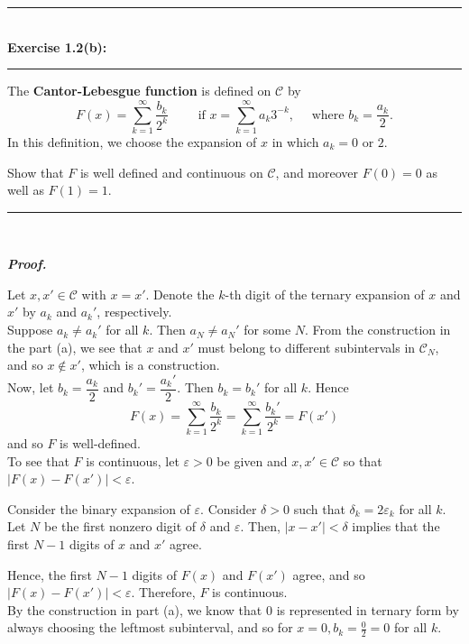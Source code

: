 \documentclass[a4paper,11pt]{article}
\begin{document}
\begin{flushleft}
	\rule[-0.5ex]{17cm}{2pt}\\
		\textbf{Exercise 1.2(b):}\\
	\rule[1.5ex]{17cm}{0.5pt}
		The \textbf{Cantor-Lebesgue function} is defined on $\mathcal{C}$ by
			$$F(x) = \overset{\infty}{\underset{k = 1}{\sum}} \frac{b_k}{2^k}
			\quad \quad \text{ if }
			x = \overset{\infty}{\underset{k = 1}{\sum}} a_k 3^{-k},
			\quad \text{ where } b_k = \frac{a_k}{2}.$$
		In this definition, we choose the expansion of $x$ in which $a_k = 0$ or $2$.

		Show that $F$ is well defined and continuous on $\mathcal{C}$, and moreover $F(0) = 0$ as well as $F(1) = 1$.
	\rule[1.0ex]{17cm}{0.5pt}\
\end{flushleft}

\textbf{\textit{Proof.}}

Let $x, x' \in \mathcal{C}$ with $x = x'$. Denote the $k$-th digit of the ternary expansion of $x$ and $x'$ by $a_k$ and $a_k'$, respectively.\\

Suppose $a_k \neq a_k'$ for all $k$. Then $a_N \neq a_N'$ for some $N$. From the construction in the part (a), we see that $x$ and $x'$ must belong to different subintervals in $\mathcal{C}_N$, and so $x \notin x'$, which is a construction.\\

Now, let $b_k = \dfrac{a_k}{2}$ and $b_k' = \dfrac{a_k'}{2}$. Then $b_k = b_k'$ for all $k$. Hence
	$$F(x)
	= \overset{\infty}{\underset{k = 1}{\sum}} \frac{b_k}{2^k}
	= \overset{\infty}{\underset{k = 1}{\sum}} \frac{b_k'}{2^k}
	= F(x')$$
and so $F$ is well-defined.\\

To see that $F$ is continuous, let $\varepsilon > 0$ be given and $x, x' \in \mathcal{C}$ so that $|F(x) - F(x')| < \varepsilon$.

Consider the binary expansion of $\varepsilon$. Consider $\delta > 0$ such that $\delta_k = 2 \varepsilon_k$ for all $k$. Let $N$ be the first nonzero digit of $\delta$ and $\varepsilon$. Then, $|x - x'| < \delta$ implies that the first $N - 1$ digits of $x$ and $x'$ agree.

Hence, the first $N - 1$ digits of $F(x)$ and $F(x')$ agree, and so $|F(x) - F(x')| < \varepsilon$. Therefore, $F$ is continuous.\\

By the construction in part (a), we know that $0$ is represented in ternary form by always choosing the leftmost subinterval, and so for $x = 0, b_k = \frac{0}{2} = 0$ for all $k$.
\end{document}
